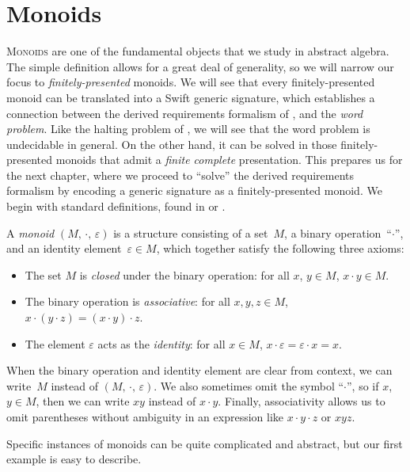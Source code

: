 \documentclass[../generics]{subfiles}
\begin{document}
\chapter{Monoids}\label{chap:monoids}

\lettrine{M}{onoids} are one of the fundamental objects that we study in abstract algebra. The simple definition allows for a great deal of generality, so we will narrow our focus to \emph{finitely-presented} monoids. We will see that every finitely-presented monoid can be translated into a Swift generic signature, which establishes a connection between the derived requirements formalism of , and the \emph{word problem}. Like the halting problem of , we will see that the word problem is undecidable in general. On the other hand, it can be solved in those finitely-presented monoids that admit a \emph{finite complete} presentation. This prepares us for the next chapter, where we proceed to ``solve'' the derived requirements formalism by encoding a generic signature as a finitely-presented monoid. We begin with standard definitions, found in \cite{semigroup} or \cite{book2012string}.
\begin{definition}
A \emph{monoid} \index{$\cdot$}$(M,\, \cdot,\, \varepsilon)$ is a structure consisting of a set~$M$, a binary operation~``\;$\cdot$\;'', and an identity element~$\varepsilon\in M$, which together satisfy the following three axioms:
\begin{itemize}
\item The set $M$ is \emph{closed} under the binary operation: for all $x$, $y \in M$, $x\cdot y\in M$.
\item The binary operation is \emph{associative}: for all $x, y, z \in M$, $x\cdot(y\cdot z)=(x\cdot y)\cdot z$.
\item The element $\varepsilon$ acts as the \index{$\varepsilon$}\emph{identity}: for all $x\in M$, $x\cdot \varepsilon=\varepsilon\cdot x=x$.
\end{itemize}
When the binary operation and identity element are clear from context, we can write~$M$ instead of $(M,\,\cdot,\,\varepsilon)$. We also sometimes omit the symbol ``\;$\cdot$\;'', so if $x$, $y\in M$, then we can write $xy$ instead of $x\cdot y$. Finally, associativity allows us to omit parentheses without ambiguity in an expression like $x\cdot y\cdot z$ or $xyz$.

Specific instances of monoids can be quite complicated and abstract, but our first example is easy to describe.
\end{definition}
\end{document}
